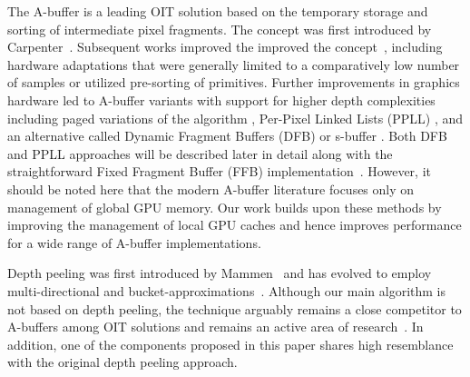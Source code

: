 \documentclass{egpubl}
\newcommand{\red}[1]{{\color{red}#1}}
\newcommand{\yellow}[1]{{\color{Goldenrod}#1}}
\newcommand{\green}[1]{{\color{PineGreen}#1}}
\newcommand{\minor}[1]{\yellow{#1}}
\newcommand{\new}[1]{\green{#1}}
\newcommand{\ab}{\mbox{A-buffer}}
\begin{document}
\new{
The \ab{} is a leading OIT solution based on the temporary storage and sorting of intermediate pixel fragments. 
} 
\minor{
The concept was first introduced by Carpenter~\cite{Carpenter1984}. 
Subsequent works improved the improved the concept~\cite{ebert1990abuffer,bavoil2007multifragkbuffer,myers2007techrep,Kerzner2013,Vasilakis2014}, including hardware adaptations that were generally limited to a comparatively low number of samples or utilized pre-sorting of primitives. 
Further improvements in graphics hardware led to \ab{} variants with support for higher depth complexities including paged variations of the algorithm \cite{kainz2009ray,Crassin2010}, Per-Pixel Linked Lists (PPLL) \cite{Yang2010}, and an alternative called Dynamic Fragment Buffers (DFB) or s-buffer \cite{Maule2012,Vasilakis2012}. 
} 
%
Both DFB and PPLL approaches will be described later in detail along with the straightforward Fixed Fragment Buffer (FFB) implementation~\cite{Crassin2010}. 
However, it should be noted here that the modern \ab{} literature focuses only on management of global GPU memory. 
Our work builds upon these methods by improving the management of local GPU caches and hence improves performance for a wide range of \ab{} implementations.

Depth peeling was first introduced by Mammen~\cite{Mammen1989} and has evolved to employ multi-directional and bucket-approximations~\cite{Everitt2001,carr2008depthpeel,Bavoil2008,Liu2009}. 
Although our main algorithm is not based on depth peeling, the technique arguably remains a close competitor to \ab{}s among OIT solutions \new{and remains an active area of research~\cite{Vasilakis2013}}. 
In addition, one of the components proposed in this paper shares high resemblance with the original depth peeling approach. 


\end{document}
